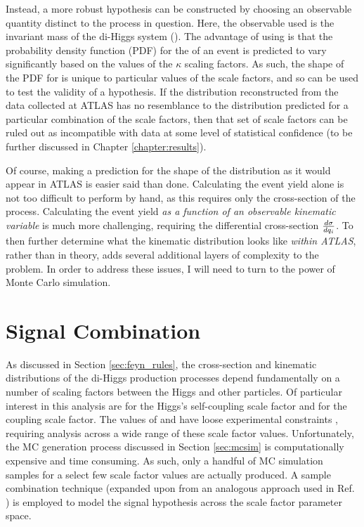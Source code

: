     Instead, a more robust hypothesis can be constructed by choosing an observable quantity distinct to the process in question.
    Here, the observable used is the invariant mass of the di-Higgs system (\mhh).
    The advantage of using \mhh is that the probability density function (PDF) for the \mhh of an event
        is predicted to vary significantly based on the values of the $\kappa$ scaling factors.
    As such, the shape of the PDF for \mhh is unique to particular values of the scale factors, 
        and so can be used to test the validity of a hypothesis.
    If the \mhh distribution reconstructed from the data collected at ATLAS has no resemblance to
        the \mhh distribution predicted for a particular combination of the scale factors,
        then that set of scale factors can be ruled out as incompatible with data
        at some level of statistical confidence
        (to be further discussed in Chapter \ref{chapter:results}).

    Of course, making a prediction for the shape of the \mhh distribution as it would appear in ATLAS is easier said than done.
    Calculating the event yield alone is not too difficult to perform by hand,
        as this requires only the cross-section of the process.
    Calculating the event yield \textit{as a function of an observable kinematic variable} is much more challenging,
        requiring the differential cross-section $\frac{d \sigma}{d q_i}$.
    To then further determine what the kinematic distribution looks like \textit{within ATLAS}, rather than in theory,
        adds several additional layers of complexity to the problem.
    In order to address these issues, I will need to turn to the power of Monte Carlo simulation.



\section{Signal Combination} \label{sec:signal_combination}

    As discussed in Section \ref{sec:feyn_rules},
        the cross-section and kinematic distributions of the di-Higgs production processes
        depend fundamentally on a number of scaling factors between the Higgs and other particles.
    Of particular interest in this analysis are \kl for the Higgs's self-coupling scale factor and \kvv for the \HHVV coupling scale factor.
    The values of \kl and \kvv have loose experimental constraints \cite{EXOT-2016-31} \cite{HDBS-2018-18-witherratum} \cite{ATLAS-CONF-2019-049},
        requiring analysis across a wide range of these scale factor values.
    Unfortunately, the MC generation process discussed in Section \ref{sec:mcsim} is computationally expensive and time consuming.
    As such, only a handful of MC simulation samples for a select few scale factor values are actually produced.
    A sample combination technique 
        (expanded upon from an analogous approach used in Ref. \cite{combination_origin})
        is employed to model the signal hypothesis across the scale factor parameter space.

